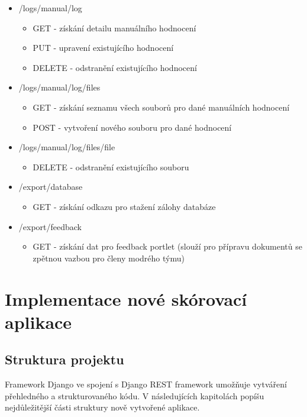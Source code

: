 \documentclass[
  digital, %
  twoside, %
  table,   %
  lof,     %
  lot,     %
]{fithesis3}
\begin{document}
\begin{itemize}
    \item /logs/manual/{log}
    \begin{itemize}
        \item GET - získání detailu manuálního hodnocení
        \item PUT - upravení existujícího hodnocení
        \item DELETE - odstranění existujícího hodnocení
    \end{itemize}
            
    \item /logs/manual/{log}/files
    \begin{itemize}
        \item GET - získání seznamu všech souborů pro dané manuálních hodnocení
        \item POST - vytvoření nového souboru pro dané hodnocení
    \end{itemize}
            
    \item /logs/manual/{log}/files/{file}
    \begin{itemize}
        \item DELETE - odstranění existujícího souboru
    \end{itemize}
            
    \item /export/database
    \begin{itemize}
        \item GET - získání odkazu pro stažení zálohy databáze
    \end{itemize}
                
    \item /export/feedback
    \begin{itemize}
        \item GET - získání dat pro feedback portlet (slouží pro přípravu dokumentů se zpětnou vazbou pro členy modrého týmu)
    \end{itemize}

\end{itemize}


\chapter{Implementace nové skórovací aplikace}

\section{Struktura projektu}
Framework Django ve spojení s Django REST framework umožňuje vytváření přehledného a strukturovaného kódu. V následujících kapitolách popíšu nejdůležitější části struktury nově vytvořené aplikace.
\end{document}
